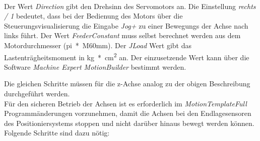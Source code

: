 \documentclass[../../../Bachelorarbeit.tex]{subfiles}
\begin{document}
\begin{enumerate}
\begin{minipage}[t]{\linewidth}
        \raggedright
        \label{fig:my-img36}
    \end{minipage}
    \bigskip \\
    Der Wert \textit{Direction} gibt den Drehsinn des Servomotors an. Die Einstellung \textit{rechts / 1} bedeutet, dass bei der Bedienung des Motors über die Steuerungsvisualisierung die Eingabe \textit{Jog+} zu einer Bewegungs der Achse nach links führt. Der Wert \textit{FeederConstant} muss selbst berechnet werden aus dem Motordurchmesser (\si{pi*M60mm}). Der \textit{JLoad} Wert gibt das Lastenträgheitsmoment in \si{kg*cm^2} an. Der einzusetzende Wert kann über die Software \textit{Machine Expert MotionBuilder} bestimmt werden. 
\end{enumerate}

Die gleichen Schritte müssen für die z-Achse analog zu der obigen Beschreibung durchgeführt werden.\\
\bigskip
Für den sicheren Betrieb der Achsen ist es erforderlich im \textit{MotionTemplateFull} Programmänderungen vorzunehmen, damit die Achsen bei den Endlagesensoren des Positioniersystems stoppen und nicht darüber hinaus bewegt werden können. Folgende Schritte sind dazu nötig:
\end{document}

